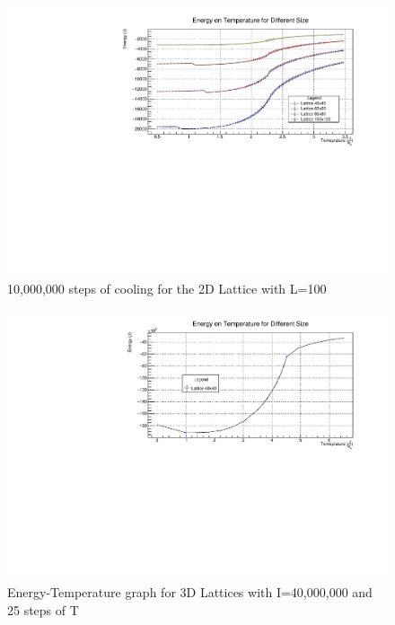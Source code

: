 \documentclass[11pt,a4paper]{article}
\begin{document}
\begin{figure}[h!]
  \centering
  \includegraphics[width=\columnwidth]{img/2d/c1.pdf}
  \caption{10,000,000 steps of cooling for the 2D Lattice with L=100}
\end{figure}

\begin{figure}[h!]
  \centering
  \includegraphics[width=\columnwidth]{img/3d/c1.pdf}
  \caption{Energy-Temperature graph for 3D Lattices with I=40,000,000 and 25 steps of T}
\end{figure}
\end{document}
